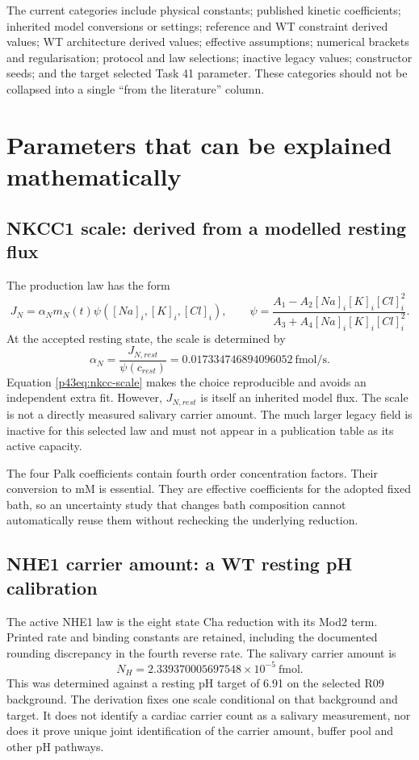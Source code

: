 The current categories include physical constants; published kinetic coefficients; inherited model conversions or settings; reference and WT constraint derived values; WT architecture derived values; effective assumptions; numerical brackets and regularisation; protocol and law selections; inactive legacy values; constructor seeds; and the target selected Task 41 parameter. These categories should not be collapsed into a single ``from the literature'' column.

\section{Parameters that can be explained mathematically}
\subsection{NKCC1 scale: derived from a modelled resting flux}
The production law has the form
\[
 J_N=\alpha_Nm_N(t)\psi([Na]_i,[K]_i,[Cl]_i),\qquad
 \psi=\frac{A_1-A_2[Na]_i[K]_i[Cl]_i^2}
 {A_3+A_4[Na]_i[K]_i[Cl]_i^2}.
\]
At the accepted resting state, the scale is determined by
\begin{equation}
 \alpha_N=\frac{J_{N,rest}}{\psi(c_{rest})}
 =0.017334746894096052\ \mathrm{fmol/s}.
 \label{p43eq:nkcc-scale}
\end{equation}
Equation \cref{p43eq:nkcc-scale} makes the choice reproducible and avoids an independent extra fit. However, $J_{N,rest}$ is itself an inherited model flux. The scale is not a directly measured salivary carrier amount. The much larger legacy field  is inactive for this selected law and must not appear in a publication table as its active capacity.

The four Palk coefficients contain fourth order concentration factors. Their conversion to mM is essential. They are effective coefficients for the adopted fixed bath, so an uncertainty study that changes bath composition cannot automatically reuse them without rechecking the underlying reduction.

\subsection{NHE1 carrier amount: a WT resting pH calibration}
The active NHE1 law is the eight state Cha reduction with its Mod2 term. Printed rate and binding constants are retained, including the documented rounding discrepancy in the fourth reverse rate. The salivary carrier amount is
\[
 N_H=2.339370005697548\times10^{-5}\ \mathrm{fmol}.
\]
This was determined against a resting pH target of 6.91 on the selected R09 background. The derivation fixes one scale conditional on that background and target. It does not identify a cardiac carrier count as a salivary measurement, nor does it prove unique joint identification of the carrier amount, buffer pool and other pH pathways.

